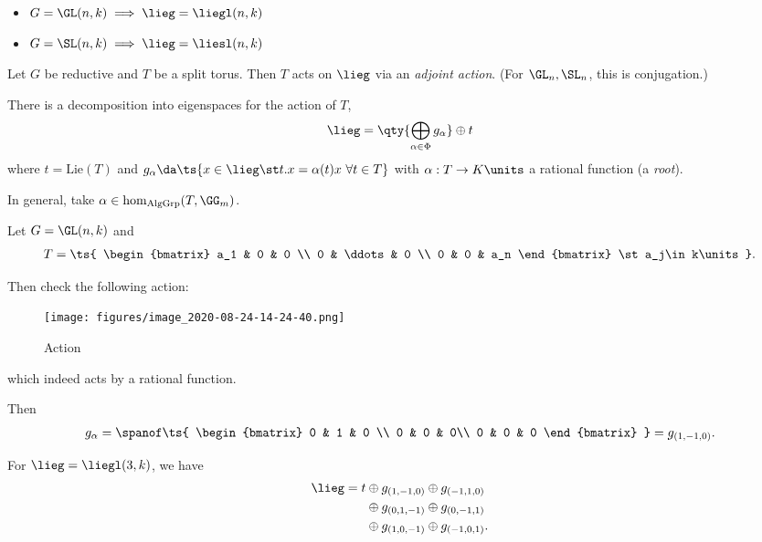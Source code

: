 \begin{example}

\hfill

\begin{itemize}
\tightlist
\item
  \(G = \GL(n, k) \implies\lieg = \liegl(n, k)\)
\item
  \(G = \SL(n, k) \implies\lieg = \liesl(n, k)\)
\end{itemize}

\end{example}

Let \(G\) be reductive and \(T\) be a split torus. Then \(T\) acts on
\(\lieg\) via an \emph{adjoint action}. (For \(\GL_n, \SL_n\), this is
conjugation.)

There is a decomposition into eigenspaces for the action of \(T\),
\begin{align*}  
\lieg = \qty{\bigoplus_{\alpha\in \Phi} g_\alpha} \oplus t
\end{align*} where \(t = \mathrm{Lie}(T)\) and
\(g_\alpha \da \ts{x\in \lieg\st t.x = \alpha(t) x\,\, \forall t\in T}\)
with \(\alpha: T\to K\units\) a rational function (a \emph{root}).

In general, take \(\alpha\in\hom_{\text{AlgGrp}}(T, \GG_m)\).

\begin{example}

Let \(G = \GL(n, k)\) and
\begin{align*}  
T = \ts{
\begin{bmatrix}
a_1 & 0 & 0 \\
0 & \ddots & 0 \\
0 & 0 & a_n
\end{bmatrix}
\st a_j\in k\units
}
.\end{align*}

Then check the following action:

\begin{figure}
\centering
\texttt{[image: figures/image\_2020-08-24-14-24-40.png]}
\caption{Action}
\end{figure}

which indeed acts by a rational function.

Then
\begin{align*}  
g_\alpha = \spanof \ts{
\begin{bmatrix}
0 & 1 & 0 \\
0 & 0 & 0\\
0 & 0 & 0
\end{bmatrix}
} = g_{(1, -1, 0)}
.\end{align*}

For \(\lieg = \liegl(3, k)\), we have
\begin{align*}  
\lieg = t 
&\oplus g_{(1, -1, 0)}
\oplus g_{(-1, 1, 0)}  \\
&\oplus g_{(0, 1, -1)} 
\oplus g_{(0, -1, 1)}  \\
&\oplus g_{(1, 0, -1)} 
\oplus g_{(-1, 0, 1)} 
.\end{align*}

\end{example}

